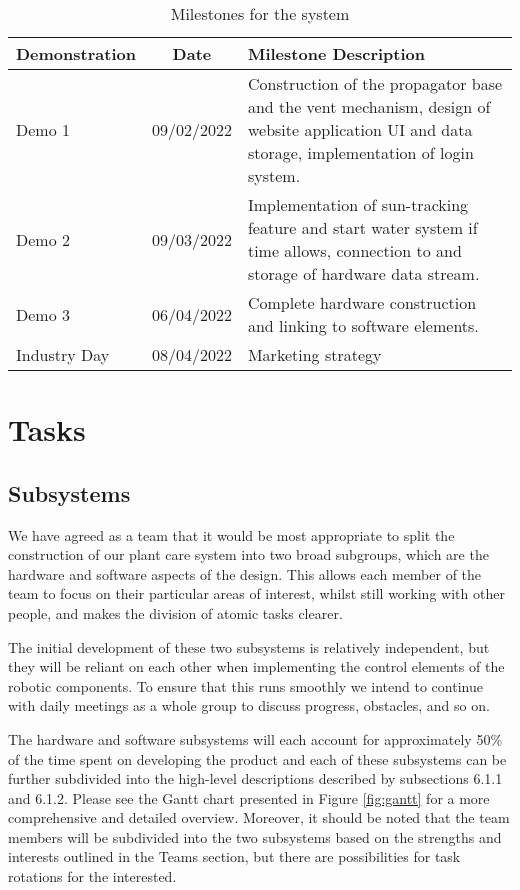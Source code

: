 \documentclass{article}
\begin{document}
\begin{table*}[ht]
\vskip 3mm
\begin{center}
\begin{small}
\begin{sc}
\begin{tabular}{lcp{12cm}}
\hline
\abovespace\belowspace
Demonstration & Date  & Milestone Description \\
\hline
\abovespace
Demo 1       & 09/02/2022 & Construction of the propagator base and the vent mechanism, design of website application UI and data storage, implementation of login system. \\
Demo 2       & 09/03/2022 & Implementation of sun-tracking feature and start water system if time allows, connection to and storage of hardware data stream. \\
Demo 3       & 06/04/2022 & Complete hardware construction and linking to software elements. \\
Industry Day & 08/04/2022 & Marketing strategy
\belowspace
\end{tabular}
\end{sc}
\end{small}
\caption{Milestones for the system}
\label{tab:milestones}
\end{center}
\vskip -3mm
\end{table*}


\section{Tasks}

\subsection{Subsystems}
We have agreed as a team that it would be most appropriate to split the construction of our plant care system into two broad subgroups, which are the hardware and software aspects of the design. This allows each member of the team to focus on their particular areas of interest, whilst still working with other people, and makes the division of atomic tasks clearer.

The initial development of these two subsystems is relatively independent, but they will be reliant on each other when implementing the control elements of the robotic components. To ensure that this runs smoothly we intend to continue with daily meetings as a whole group to discuss progress, obstacles, and so on.

The hardware and software subsystems will each account for approximately 50\% of the time spent on developing the product and each of these subsystems can be further subdivided into the high-level descriptions described by subsections 6.1.1 and 6.1.2. Please see the Gantt chart presented in Figure \ref{fig:gantt} for a more comprehensive and detailed overview. Moreover, it should be noted that the team members will be subdivided into the two subsystems based on the strengths and interests outlined in the Teams section, but there are possibilities for task rotations for the interested. 
\end{document}
